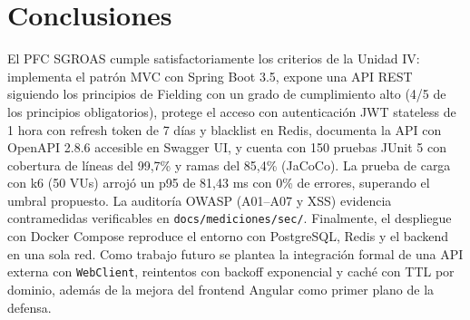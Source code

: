 \section{Conclusiones}
El PFC SGROAS cumple satisfactoriamente los criterios de la Unidad IV: implementa el patrón MVC con Spring Boot
3.5, expone una API REST siguiendo los principios de Fielding con un grado de cumplimiento alto (4/5 de los
principios obligatorios), protege el acceso con autenticación JWT stateless de 1 hora con refresh token de 7 días y
blacklist en Redis, documenta la API con OpenAPI 2.8.6 accesible en Swagger UI, y cuenta con 150 pruebas JUnit 5
con cobertura de líneas del 99,7\% y ramas del 85,4\% (JaCoCo). La prueba de carga con k6 (50 VUs) arrojó un p95
de 81,43 ms con 0\% de errores, superando el umbral propuesto. La auditoría OWASP (A01--A07 y XSS) evidencia
contramedidas verificables en \texttt{docs/mediciones/sec/}. Finalmente, el despliegue con Docker Compose reproduce
el entorno con PostgreSQL, Redis y el backend en una sola red. Como trabajo futuro se plantea la integración formal
de una API externa con \texttt{WebClient}, reintentos con backoff exponencial y caché con TTL por dominio, además
de la mejora del frontend Angular como primer plano de la defensa.